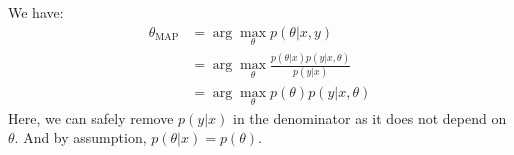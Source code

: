 \begin{answer}
We have:
\begin{align}
	\theta_{\text{MAP}} 
	&= \arg\max_{\theta} p(\theta|x,y) \\
	&= \arg\max_{\theta} \frac{p(\theta|x) p(y|x,\theta)}{p(y|x)} \\
	&= \arg\max_{\theta} p(\theta)p(y|x, \theta)
\end{align}
Here, we can safely remove $p(y|x)$ in the denominator as it does not depend on $\theta$. And by assumption, $p(\theta|x) = p(\theta)$. \\
\end{answer}
